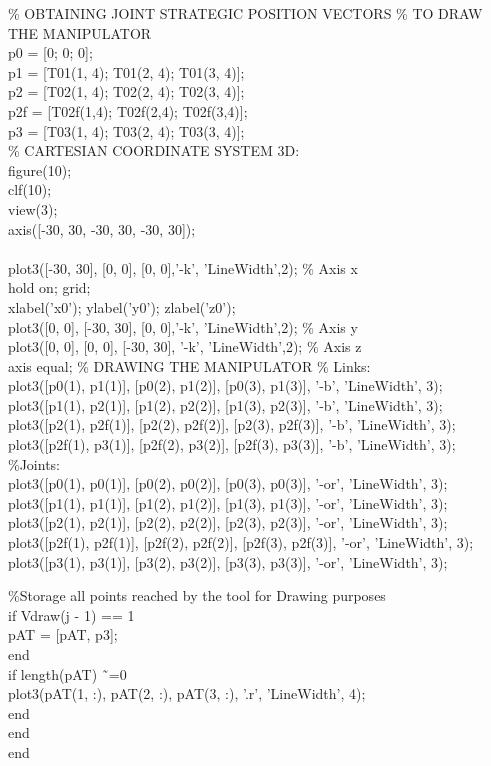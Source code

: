 \documentclass[12pt]{article}
\begin{document}
\% OBTAINING JOINT STRATEGIC POSITION VECTORS
\% TO DRAW THE MANIPULATOR
\\p0 = [0; 0; 0];
\\p1 = [T01(1, 4); T01(2, 4); T01(3, 4)];
\\p2 = [T02(1, 4); T02(2, 4); T02(3, 4)];
\\p2f = [T02f(1,4); T02f(2,4); T02f(3,4)];
\\p3 = [T03(1, 4); T03(2, 4); T03(3, 4)];
\\
\% CARTESIAN COORDINATE SYSTEM 3D:
\\figure(10);
\\clf(10);
\\view(3);
\\axis([-30, 30, -30, 30, -30, 30]);
\\
\\plot3([-30, 30], [0, 0], [0, 0],'-k', 'LineWidth',2); \% Axis x
\\hold on; grid;
\\xlabel('x0'); ylabel('y0'); zlabel('z0');
\\plot3([0, 0], [-30, 30], [0, 0],'-k', 'LineWidth',2); \% Axis y
\\plot3([0, 0], [0, 0], [-30, 30], '-k', 'LineWidth',2); \% Axis z
\\axis equal;
\% DRAWING THE MANIPULATOR
\% Links:
\\plot3([p0(1), p1(1)], [p0(2), p1(2)], [p0(3), p1(3)], '-b', 'LineWidth', 3);
\\plot3([p1(1), p2(1)], [p1(2), p2(2)], [p1(3), p2(3)], '-b', 'LineWidth', 3);
\\plot3([p2(1), p2f(1)], [p2(2), p2f(2)], [p2(3), p2f(3)], '-b', 'LineWidth', 3);
\\plot3([p2f(1), p3(1)], [p2f(2), p3(2)], [p2f(3), p3(3)], '-b', 'LineWidth', 3);
\\
\%Joints:
\\plot3([p0(1), p0(1)], [p0(2), p0(2)], [p0(3), p0(3)], '-or', 'LineWidth', 3);
\\plot3([p1(1), p1(1)], [p1(2), p1(2)], [p1(3), p1(3)], '-or', 'LineWidth', 3);
\\plot3([p2(1), p2(1)], [p2(2), p2(2)], [p2(3), p2(3)], '-or', 'LineWidth', 3);
\\plot3([p2f(1), p2f(1)], [p2f(2), p2f(2)], [p2f(3), p2f(3)], '-or', 'LineWidth', 3);
\\plot3([p3(1), p3(1)], [p3(2), p3(2)], [p3(3), p3(3)], '-or', 'LineWidth', 3);

    \%Storage all points reached by the tool for Drawing purposes  
    \\if Vdraw(j - 1) == 1
    \\    pAT = [pAT, p3];
    \\end
    \\if length(pAT) \~\ =0
    \\    plot3(pAT(1, :), pAT(2, :), pAT(3, :), '.r', 'LineWidth', 4);
    \\end %
\\end
\\end
\end{document}
